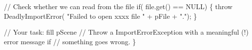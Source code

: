 \begin{DoxyCode}
    \textcolor{comment}{// Check whether we can read from the file}
    \textcolor{keywordflow}{if}( file.get() == NULL) \{
        \textcolor{keywordflow}{throw} DeadlyImportError( \textcolor{stringliteral}{"Failed to open xxxx file "} + pFile + \textcolor{stringliteral}{"."});
    \}
    
    \textcolor{comment}{// Your task: fill pScene}
    \textcolor{comment}{// Throw a ImportErrorException with a meaningful (!) error message if }
    \textcolor{comment}{// something goes wrong.}
\}
\end{DoxyCode}
 